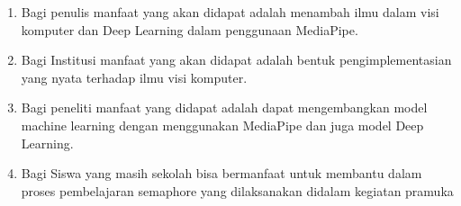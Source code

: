 \begin{enumerate}  
\item	Bagi penulis manfaat yang akan didapat adalah menambah ilmu dalam visi komputer dan Deep Learning dalam penggunaan MediaPipe.
\item	Bagi Institusi manfaat yang akan didapat adalah bentuk pengimplementasian yang nyata terhadap ilmu visi komputer.
\item	Bagi peneliti manfaat yang didapat adalah dapat mengembangkan model machine learning dengan menggunakan MediaPipe dan juga model Deep Learning.
\item	Bagi Siswa yang masih sekolah bisa bermanfaat untuk membantu dalam proses pembelajaran semaphore yang dilaksanakan didalam kegiatan pramuka
\end{enumerate}